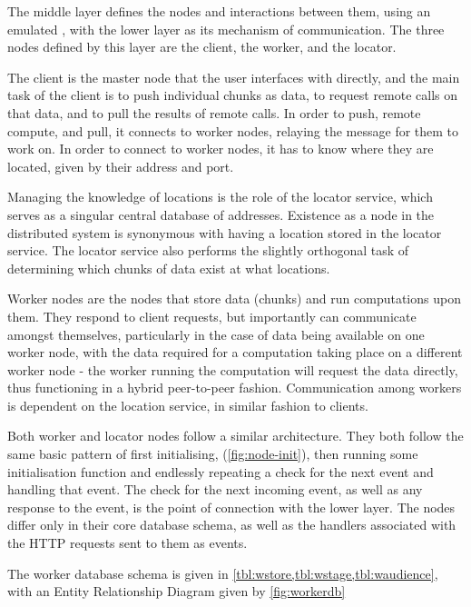 The middle layer \chunknet{} defines the nodes and interactions between them, using an emulated , with the lower \orcv{} layer as its mechanism of communication.
The three nodes defined by this layer are the client, the worker, and the locator.

The client is the master node that the user interfaces with directly, and the main task of the client is to push individual chunks as data, to request remote calls on that data, and to pull the results of remote calls.
In order to push, remote compute, and pull, it connects to worker nodes, relaying the message for them to work on.
In order to connect to worker nodes, it has to know where they are located, given by their address and port.

Managing the knowledge of locations is the role of the locator service, which serves as a singular central database of addresses.
Existence as a node in the distributed system is synonymous with having a location stored in the locator service.
The locator service also performs the slightly orthogonal task of determining which chunks of data exist at what locations.

Worker nodes are the nodes that store data (chunks) and run computations upon them.
They respond to client requests, but importantly can communicate amongst themselves, particularly in the case of data being available on one worker node, with the data required for a computation taking place on a different worker node - the worker running the computation will request the data directly, thus functioning in a hybrid peer-to-peer fashion.
Communication among workers is dependent on the location service, in similar fashion to clients.

Both worker and locator nodes follow a similar architecture.
They both follow the same basic pattern of first initialising, (\cref{fig:node-init}), then running some initialisation function and endlessly repeating a check for the next event and handling that event.
The check for the next incoming event, as well as any response to the event, is the point of connection with the lower \orcv{} layer.
The nodes differ only in their core database schema, as well as the handlers associated with the HTTP requests sent to them as events.

The worker database schema is given in \cref{tbl:wstore,tbl:wstage,tbl:waudience}, with an Entity Relationship Diagram given by \cref{fig:workerdb}



